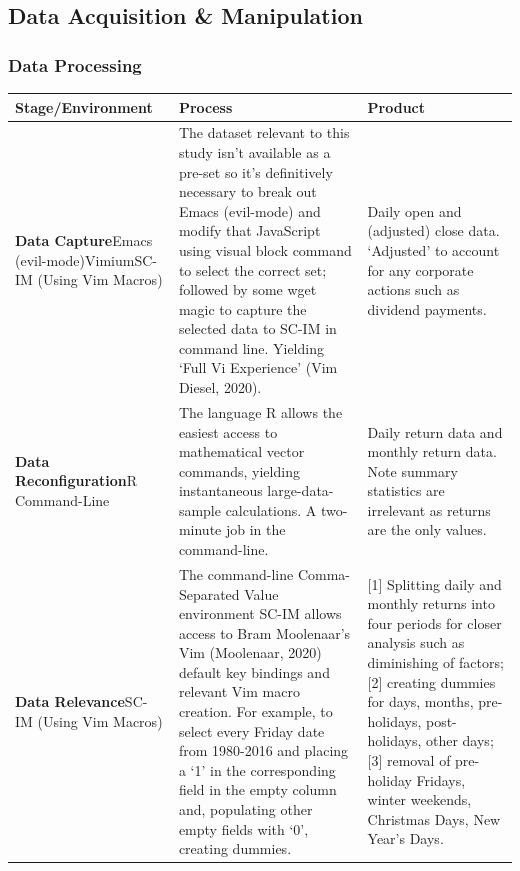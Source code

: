 \documentclass[11pt, english]{article}
\begin{document}
	\newpage

	\subsection{Data Acquisition \& Manipulation}

		\subsubsection{Data Processing}

		\begin{center}
			\scriptsize
		\begin{longtable}{p{3.75cm}p{5.5cm}p{4cm}}
			\textbf{Stage/Environment} & \textbf{Process} & \textbf{Product}\\
                        \hline 
			\textbf{Data Capture}\newline Emacs (evil-mode)\newline Vimium\newline SC-IM (Using Vim Macros) & The dataset relevant to this study isn’t available as a pre-set so it’s definitively necessary to break out Emacs (evil-mode) and modify that JavaScript using visual block command to select the correct set; followed by some wget magic to capture the selected data to SC-IM in command line. Yielding `Full Vi Experience’ (Vim Diesel, 2020). & Daily open and (adjusted) close data. `Adjusted’ to account for any corporate actions such as dividend payments.\\
			\textbf{Data Reconfiguration}\newline R Command-Line & The language R allows the easiest access to mathematical vector commands, yielding instantaneous large-data-sample calculations. A two-minute job in the command-line. & Daily return data and monthly return data. Note summary statistics are irrelevant as returns are the only values.\\
			\textbf{Data Relevance}\newline SC-IM (Using Vim Macros) & The command-line Comma-Separated Value environment SC-IM allows access to Bram Moolenaar’s Vim (Moolenaar, 2020) default key bindings and relevant Vim macro creation. For example, to select every Friday date from 1980-2016 and placing a `1' in the corresponding field in the empty column and, populating other empty fields with `0', creating dummies. & [1] Splitting daily and monthly returns into four periods for closer analysis such as diminishing of factors; [2] creating dummies for days, months, pre-holidays, post-holidays, other days; [3] removal of pre-holiday Fridays, winter weekends, Christmas Days, New Year’s Days.\\

\end{longtable}
\end{center}
\end{document}
